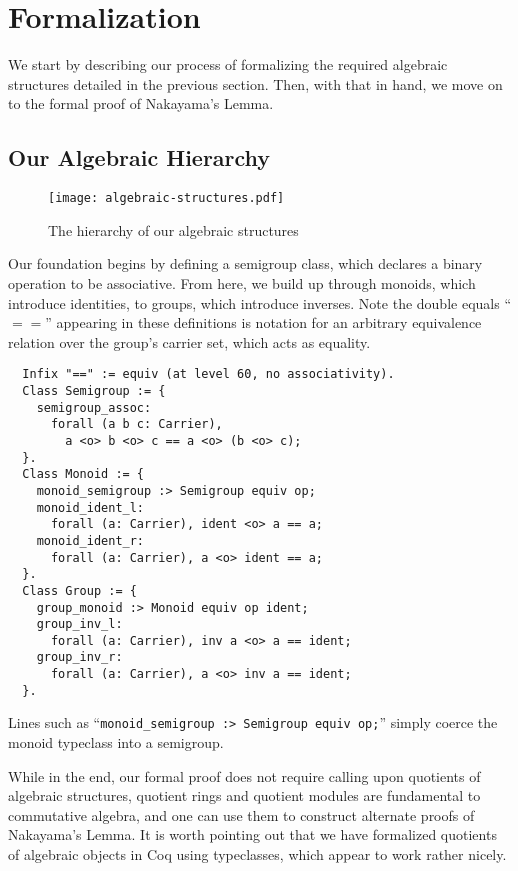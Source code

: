 \documentclass{article}
\begin{document}
\section{Formalization}
We start by describing our process of formalizing the required algebraic
structures detailed in the previous section. Then, with that in hand, we move
on to the formal proof of Nakayama's Lemma.

\subsection{Our Algebraic Hierarchy}
\begin{figure}[t]
  \caption{The hierarchy of our algebraic structures}
  \texttt{[image: algebraic-structures.pdf]}
  \centering
\end{figure}

Our foundation begins by defining a semigroup class, which declares a binary
operation to be associative. From here, we build up through monoids, which
introduce identities, to groups, which introduce inverses. Note the double
equals ``$==$'' appearing in these definitions is notation for an arbitrary
equivalence relation over the group's carrier set, which acts as equality.

\begin{verbatim}
  Infix "==" := equiv (at level 60, no associativity).
  Class Semigroup := {
    semigroup_assoc:
      forall (a b c: Carrier),
        a <o> b <o> c == a <o> (b <o> c);
  }.
  Class Monoid := {
    monoid_semigroup :> Semigroup equiv op;
    monoid_ident_l:
      forall (a: Carrier), ident <o> a == a;
    monoid_ident_r:
      forall (a: Carrier), a <o> ident == a;
  }.
  Class Group := {
    group_monoid :> Monoid equiv op ident;
    group_inv_l:
      forall (a: Carrier), inv a <o> a == ident;
    group_inv_r:
      forall (a: Carrier), a <o> inv a == ident;
  }.
\end{verbatim}
Lines such as  ``\verb|monoid_semigroup :> Semigroup equiv op;|'' simply coerce
the monoid typeclass into a semigroup.

While in the end, our formal proof does not require calling upon quotients of
algebraic structures, quotient rings and quotient modules are fundamental to
commutative algebra, and one can use them to construct alternate proofs of
Nakayama's Lemma. It is worth pointing out that we have formalized quotients of
algebraic objects in Coq using typeclasses, which appear to work rather nicely. 
\end{document}
